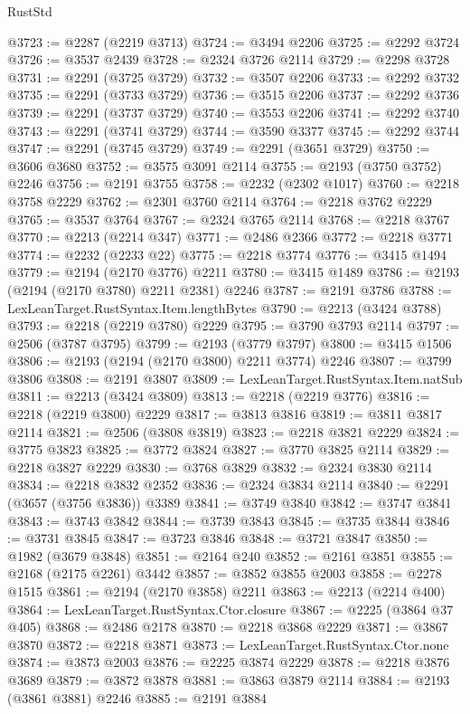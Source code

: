 \begin{lexlean}{RustStd}
\begin{coremodule}
@3723 := @2287 (@2219 @3713)
@3724 := @3494 @2206
@3725 := @2292 @3724
@3726 := @3537 @2439
@3728 := @2324 @3726 @2114
@3729 := @2298 @3728
@3731 := @2291 (@3725 @3729)
@3732 := @3507 @2206
@3733 := @2292 @3732
@3735 := @2291 (@3733 @3729)
@3736 := @3515 @2206
@3737 := @2292 @3736
@3739 := @2291 (@3737 @3729)
@3740 := @3553 @2206
@3741 := @2292 @3740
@3743 := @2291 (@3741 @3729)
@3744 := @3590 @3377
@3745 := @2292 @3744
@3747 := @2291 (@3745 @3729)
@3749 := @2291 (@3651 @3729)
@3750 := @3606 @3680
@3752 := @3575 @3091 @2114
@3755 := @2193 (@3750 @3752) @2246
@3756 := @2191 @3755
@3758 := @2232 (@2302 @1017)
@3760 := @2218 @3758 @2229
@3762 := @2301 @3760 @2114
@3764 := @2218 @3762 @2229
@3765 := @3537 @3764
@3767 := @2324 @3765 @2114
@3768 := @2218 @3767
@3770 := @2213 (@2214 @347)
@3771 := @2486 @2366
@3772 := @2218 @3771
@3774 := @2232 (@2233 @22)
@3775 := @2218 @3774
@3776 := @3415 @1494
@3779 := @2194 (@2170 @3776) @2211
@3780 := @3415 @1489
@3786 := @2193 (@2194 (@2170 @3780) @2211 @2381) @2246
@3787 := @2191 @3786
@3788 := LexLeanTarget.RustSyntax.Item.lengthBytes
@3790 := @2213 (@3424 @3788)
@3793 := @2218 (@2219 @3780) @2229
@3795 := @3790 @3793 @2114
@3797 := @2506 (@3787 @3795)
@3799 := @2193 (@3779 @3797)
@3800 := @3415 @1506
@3806 := @2193 (@2194 (@2170 @3800) @2211 @3774) @2246
@3807 := @3799 @3806
@3808 := @2191 @3807
@3809 := LexLeanTarget.RustSyntax.Item.natSub
@3811 := @2213 (@3424 @3809)
@3813 := @2218 (@2219 @3776)
@3816 := @2218 (@2219 @3800) @2229
@3817 := @3813 @3816
@3819 := @3811 @3817 @2114
@3821 := @2506 (@3808 @3819)
@3823 := @2218 @3821 @2229
@3824 := @3775 @3823
@3825 := @3772 @3824
@3827 := @3770 @3825 @2114
@3829 := @2218 @3827 @2229
@3830 := @3768 @3829
@3832 := @2324 @3830 @2114
@3834 := @2218 @3832 @2352
@3836 := @2324 @3834 @2114
@3840 := @2291 (@3657 (@3756 @3836)) @3389
@3841 := @3749 @3840
@3842 := @3747 @3841
@3843 := @3743 @3842
@3844 := @3739 @3843
@3845 := @3735 @3844
@3846 := @3731 @3845
@3847 := @3723 @3846
@3848 := @3721 @3847
@3850 := @1982 (@3679 @3848)
@3851 := @2164 @240
@3852 := @2161 @3851
@3855 := @2168 (@2175 @2261) @3442
@3857 := @3852 @3855 @2003
@3858 := @2278 @1515
@3861 := @2194 (@2170 @3858) @2211
@3863 := @2213 (@2214 @400)
@3864 := LexLeanTarget.RustSyntax.Ctor.closure
@3867 := @2225 (@3864 @37 @405)
@3868 := @2486 @2178
@3870 := @2218 @3868 @2229
@3871 := @3867 @3870
@3872 := @2218 @3871
@3873 := LexLeanTarget.RustSyntax.Ctor.none
@3874 := @3873 @2003
@3876 := @2225 @3874 @2229
@3878 := @2218 @3876 @3689
@3879 := @3872 @3878
@3881 := @3863 @3879 @2114
@3884 := @2193 (@3861 @3881) @2246
@3885 := @2191 @3884

\end{coremodule}
\end{lexlean}
